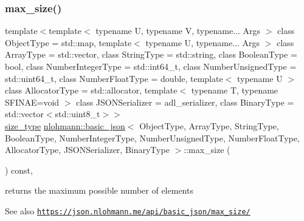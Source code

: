 \subsubsection{\texorpdfstring{max\+\_\+size()}{max\_size()}}
{\footnotesize\ttfamily template$<$template$<$ typename U, typename V, typename... Args $>$ class Object\+Type = std\+::map, template$<$ typename U, typename... Args $>$ class Array\+Type = std\+::vector, class String\+Type  = std\+::string, class Boolean\+Type  = bool, class Number\+Integer\+Type  = std\+::int64\+\_\+t, class Number\+Unsigned\+Type  = std\+::uint64\+\_\+t, class Number\+Float\+Type  = double, template$<$ typename U $>$ class Allocator\+Type = std\+::allocator, template$<$ typename T, typename S\+F\+I\+N\+A\+E=void $>$ class J\+S\+O\+N\+Serializer = adl\+\_\+serializer, class Binary\+Type  = std\+::vector$<$std\+::uint8\+\_\+t$>$$>$ \\
\hyperlink{classnlohmann_1_1basic__json_a3ada29bca70b4965f6fd37ec1c8f85f7}{size\+\_\+type} \hyperlink{classnlohmann_1_1basic__json}{nlohmann\+::basic\+\_\+json}$<$ Object\+Type, Array\+Type, String\+Type, Boolean\+Type, Number\+Integer\+Type, Number\+Unsigned\+Type, Number\+Float\+Type, Allocator\+Type, J\+S\+O\+N\+Serializer, Binary\+Type $>$\+::max\+\_\+size (\begin{DoxyParamCaption}{ }\end{DoxyParamCaption}) const\hspace{0.3cm}{\ttfamily [inline]}, {\ttfamily [noexcept]}}



returns the maximum possible number of elements 

\begin{DoxySeeAlso}{See also}
\href{https://json.nlohmann.me/api/basic_json/max_size/}{\tt https\+://json.\+nlohmann.\+me/api/basic\+\_\+json/max\+\_\+size/} 
\end{DoxySeeAlso}
\mbox{\label{classnlohmann_1_1basic__json_a844a77cb154752d12118f10af26d54cb}} 
